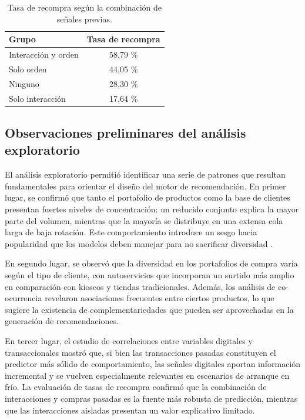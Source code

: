 \begin{table}[h]
	\centering
	\caption[Tasa de recompra por combinación de señales]{Tasa de recompra según la combinación de señales previas.}
	\label{tab:tasa_recompra}
	\begin{tabular}{l c}    
		\toprule
		\textbf{Grupo}     & \textbf{Tasa de recompra}\\
		\midrule
		Interacción y orden & 58{,}79 \% \\
		Solo orden & 44{,}05 \% \\
		Ninguno & 28{,}30 \% \\
		Solo interacción & 17{,}64 \% \\
		\bottomrule
	\end{tabular}
\end{table}

\subsection{Observaciones preliminares del análisis exploratorio}

El análisis exploratorio permitió identificar una serie de patrones que resultan fundamentales para orientar el diseño del motor de recomendación. En primer lugar, se confirmó que tanto el portafolio de productos como la base de clientes presentan fuertes niveles de concentración: un reducido conjunto explica la mayor parte del volumen, mientras que la mayoría se distribuye en una extensa cola larga de baja rotación. Este comportamiento introduce un sesgo hacia popularidad que los modelos deben manejar para no sacrificar diversidad \cite{BOOK:Anderson2006}.

En segundo lugar, se observó que la diversidad en los portafolios de compra varía según el tipo de cliente, con autoservicios que incorporan un surtido más amplio en comparación con kioscos y tiendas tradicionales. Además, los análisis de co-ocurrencia revelaron asociaciones frecuentes entre ciertos productos, lo que sugiere la existencia de complementariedades que pueden ser aprovechadas en la generación de recomendaciones.  

En tercer lugar, el estudio de correlaciones entre variables digitales y transaccionales mostró que, si bien las transacciones pasadas constituyen el predictor más sólido de comportamiento, las señales digitales aportan información incremental y se vuelven especialmente relevantes en escenarios de arranque en frío. La evaluación de tasas de recompra confirmó que la combinación de interacciones y compras pasadas es la fuente más robusta de predicción, mientras que las interacciones aisladas presentan un valor explicativo limitado.  

